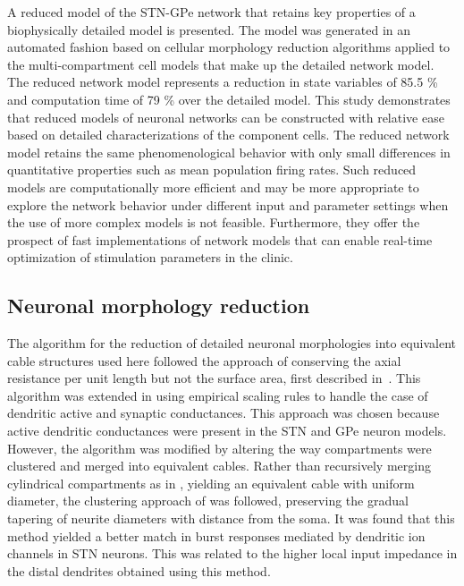 %
A reduced model of the STN-GPe network that retains key properties of a biophysically
detailed model is presented. The model was generated in an automated fashion based
on cellular morphology reduction algorithms applied to the multi-compartment cell
models that make up the detailed network model. The reduced network model represents
a reduction in state variables of 85.5 \% and computation time of 79 \% over the
detailed model. This study demonstrates that reduced models of neuronal networks
can be constructed with relative ease based on detailed characterizations of the component cells.
The reduced network model retains the same phenomenological behavior with
only small differences in quantitative properties such as mean population firing rates.
Such reduced models are computationally more efficient and may be more appropriate
to explore the network behavior under different input and parameter settings when
the use of more complex models is not feasible. Furthermore, they offer the prospect
of fast implementations of network models that can enable real-time
optimization of stimulation parameters in the clinic.

%
\subsection{Neuronal morphology reduction}
%
%
%

The algorithm for the reduction of detailed neuronal morphologies into equivalent cable
structures used here followed the approach of conserving the axial resistance per
unit length but not the surface area, first described in~\cite{bush_reduced_1993}.
This algorithm was extended in \cite{marasco_fast_2012} using empirical scaling
rules to handle the case of dendritic active and synaptic conductances.
This approach was chosen because active dendritic conductances were present
in the STN and GPe neuron models. However, the algorithm was modified
by altering the way compartments were clustered and merged into equivalent
cables. Rather than recursively merging cylindrical compartments as in
\cite{marasco_fast_2012}, yielding an equivalent cable with uniform diameter,
the clustering approach of \cite{douglas1992exploring} was followed, preserving
the gradual tapering of neurite diameters with distance from the soma.
It was found that this method yielded a better match in burst responses
mediated by dendritic ion channels in STN neurons. This was related to the
higher local input impedance in the distal dendrites obtained using this method.


